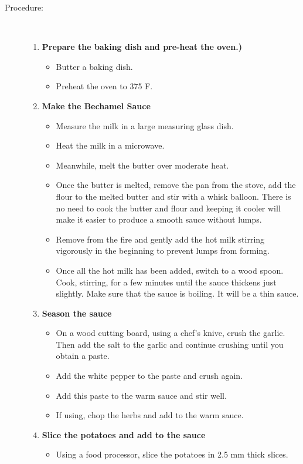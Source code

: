 \documentclass[11pt,letterpaper]{article}
\begin{document}
\begin{description}
\item[Procedure:]\ \\
	\begin{enumerate}
	\item {\bf Prepare the baking dish and pre-heat the oven.)}
		\begin{itemize}
		\item  Butter a baking dish.
		\item Preheat the oven to 375 F.
		\end{itemize}
	\item {\bf Make the Bechamel Sauce}
		\begin{itemize}
		\item Measure the milk in a large measuring glass dish.
		\item Heat the milk in a microwave.
		\item Meanwhile, melt the butter over moderate heat.
		\item Once the butter is melted, remove the pan from the stove, add the flour to the melted butter and stir with a whisk balloon. There is no need to cook the butter and flour and keeping it cooler will make it easier to produce a smooth sauce without lumps. 
		\item Remove from the fire and gently add the hot milk stirring vigorously in the beginning to prevent lumps from forming. 
		\item Once all the hot milk has been added, switch to a wood spoon. Cook, stirring, for a few minutes until the sauce thickens just slightly. Make sure that the sauce is boiling. It will be a thin sauce.
		\end{itemize}
	\item {\bf Season the sauce}
		\begin{itemize}
        		\item On a wood cutting board, using a chef's knive, crush the garlic. Then add the salt to the garlic and continue crushing until you obtain a paste.
		\item Add the white pepper to the paste and crush again.
		\item Add this paste to the warm sauce and stir well.
		\item If using, chop the herbs and add to the warm sauce. 	
		\end{itemize}
	\item {\bf Slice the potatoes and add to the sauce}
		\begin{itemize}
        		\item Using a food processor, slice the potatoes in 2.5 mm thick slices.

\end{itemize}
\end{enumerate}
\end{description}
\end{document}
